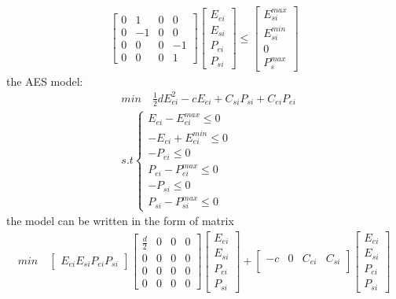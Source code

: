 \documentclass[11pt]{article} %
\begin{document}
\begin{align} 
    \begin{bmatrix}
        0 & 1 & 0 & 0\\
        0 & -1 & 0 & 0\\
        0 & 0 & 0 & -1\\
        0 & 0 & 0 & 1
    \end{bmatrix} 
    \begin{bmatrix}
        E_{ei}\\
        E_{si}\\
        P_{ei}\\
        P_{si}
    \end{bmatrix} \leq
    \begin{bmatrix}
        E_{si}^{max}\\
        E_{si}^{min}\\
        0\\
        P_{s}^{max}
    \end{bmatrix}
\end{align}
the AES model:
\begin{align}  
    &min \quad \frac{1}{2}dE_{ei}^2 -cE_{ei} + C_{si}P_{si} +  C_{ei}P_{ei}\nonumber\\
    &s.t \begin{cases}
        E_{ei} - E_{ei}^{max} \leq 0\\
         -E_{ei} + E_{ei}^{min}\leq 0\\
         -P_{ei}\leq 0\\
          P_{ei} - P_{ei}^{max} \leq 0\\
          -P_{si}\leq 0\\
          P_{si} - P_{si}^{max} \leq 0
        \end{cases}
\end{align}
the model can be written in the form of matrix
\begin{align} 
    min \quad
    \begin{bmatrix}
        E_{ei}
        E_{si}
        P_{ei}
        P_{si}
    \end{bmatrix} 
    \begin{bmatrix}
        \frac{d}{2} & 0 & 0 & 0\\
        0 & 0  & 0 & 0\\
        0 & 0 & 0 & 0\\
        0 & 0 & 0 & 0
    \end{bmatrix} 
    \begin{bmatrix}
        E_{ei}\\
        E_{si}\\
        P_{ei}\\
        P_{si}
    \end{bmatrix} +
    \begin{bmatrix}
        -c & 0 & C_{ei} & C_{si}\\
    \end{bmatrix} 
    \begin{bmatrix}
        E_{ei}\\
        E_{si}\\
        P_{ei}\\
        P_{si}
    \end{bmatrix}
\end{align}
\end{document}
